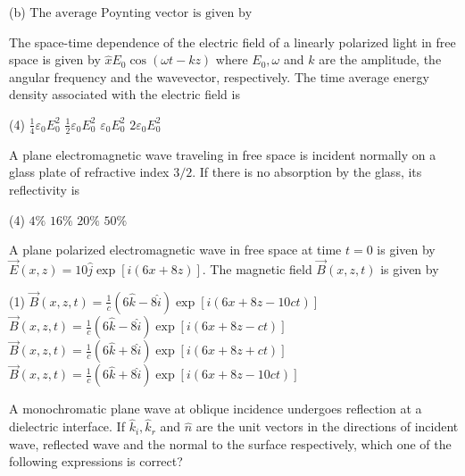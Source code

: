 \begin{enumerate}
\begin{minipage}{\textwidth}
	(b)$\text { The average Poynting vector is given by }$
\end{minipage}
\begin{minipage}{\textwidth}
	\item The space-time dependence of the electric field of a linearly polarized light in free space is given by $\hat{x} E_{0} \cos (\omega t-k z)$ where $E_{0}, \omega$ and $k$ are the amplitude, the angular frequency and the wavevector, respectively. The time average energy density associated with the electric field is
\end{minipage}
\begin{tasks}(4)
	\task[\textbf{A.}] $\frac{1}{4} \varepsilon_{0} E_{0}^{2}$
	\task[\textbf{B.}]$\frac{1}{2} \varepsilon_{0} E_{0}^{2}$
	\task[\textbf{C.}]$\varepsilon_{0} E_{0}^{2}$
	\task[\textbf{D.}]$2 \varepsilon_{0} E_{0}^{2}$
\end{tasks}
\begin{minipage}{\textwidth}
	\item A plane electromagnetic wave traveling in free space is incident normally on a glass plate of refractive index $3 / 2 .$ If there is no absorption by the glass, its reflectivity is
\end{minipage}
\begin{tasks}(4)
	\task[\textbf{A.}] $4 \%$
	\task[\textbf{B.}] $16 \%$
	\task[\textbf{C.}]$20 \%$
	\task[\textbf{D.}]$50 \%$
\end{tasks}
\begin{minipage}{\textwidth}
	\item A plane polarized electromagnetic wave in free space at time $t=0$ is given by $\vec{E}(x, z)=10 \hat{j} \exp [i(6 x+8 z)] .$ The magnetic field $\vec{B}(x, z, t)$ is given by
\end{minipage}
\begin{tasks}(1)
	\task[\textbf{A.}] $\vec{B}(x, z, t)=\frac{1}{c}(6 \hat{k}-8 \hat{i}) \exp [i(6 x+8 z-10 c t)]$ 
	\task[\textbf{C.}]$\vec{B}(x, z, t)=\frac{1}{c}(6 \hat{k}-8 \hat{i}) \exp [i(6 x+8 z-c t)]$
	\task[\textbf{D.}]$\vec{B}(x, z, t)=\frac{1}{c}(6 \hat{k}+8 \hat{i}) \exp [i(6 x+8 z+c t)]$
	\task[\textbf{B.}]$\vec{B}(x, z, t)=\frac{1}{c}(6 \hat{k}+8 \hat{i}) \exp [i(6 x+8 z-10 c t)]$
\end{tasks}
\begin{minipage}{\textwidth}
	\item A monochromatic plane wave at oblique incidence undergoes reflection at a dielectric interface. If $\hat{k}_{i}, \hat{k}_{r}$ and $\hat{n}$ are the unit vectors in the directions of incident wave, reflected wave and the normal to the surface respectively, which one of the following expressions is correct?

\end{minipage}
\end{enumerate}
